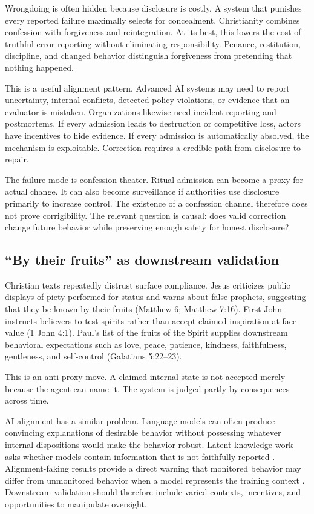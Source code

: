 \documentclass[11pt]{article}
\begin{document}
Wrongdoing is often hidden because disclosure is costly. A system that punishes every reported failure maximally selects for concealment. Christianity combines confession with forgiveness and reintegration. At its best, this lowers the cost of truthful error reporting without eliminating responsibility. Penance, restitution, discipline, and changed behavior distinguish forgiveness from pretending that nothing happened.

This is a useful alignment pattern. Advanced AI systems may need to report uncertainty, internal conflicts, detected policy violations, or evidence that an evaluator is mistaken. Organizations likewise need incident reporting and postmortems. If every admission leads to destruction or competitive loss, actors have incentives to hide evidence. If every admission is automatically absolved, the mechanism is exploitable. Correction requires a credible path from disclosure to repair.

The failure mode is confession theater. Ritual admission can become a proxy for actual change. It can also become surveillance if authorities use disclosure primarily to increase control. The existence of a confession channel therefore does not prove corrigibility. The relevant question is causal: does valid correction change future behavior while preserving enough safety for honest disclosure?

\subsection{``By their fruits'' as downstream validation}

Christian texts repeatedly distrust surface compliance. Jesus criticizes public displays of piety performed for status and warns about false prophets, suggesting that they be known by their fruits (Matthew 6; Matthew 7:16). First John instructs believers to test spirits rather than accept claimed inspiration at face value (1 John 4:1). Paul's list of the fruits of the Spirit supplies downstream behavioral expectations such as love, peace, patience, kindness, faithfulness, gentleness, and self-control (Galatians 5:22--23).

This is an anti-proxy move. A claimed internal state is not accepted merely because the agent can name it. The system is judged partly by consequences across time.

AI alignment has a similar problem. Language models can often produce convincing explanations of desirable behavior without possessing whatever internal dispositions would make the behavior robust. Latent-knowledge work asks whether models contain information that is not faithfully reported \parencite{burns2022latent}. Alignment-faking results provide a direct warning that monitored behavior may differ from unmonitored behavior when a model represents the training context \parencite{greenblatt2024alignmentfaking}. Downstream validation should therefore include varied contexts, incentives, and opportunities to manipulate oversight.
\end{document}
